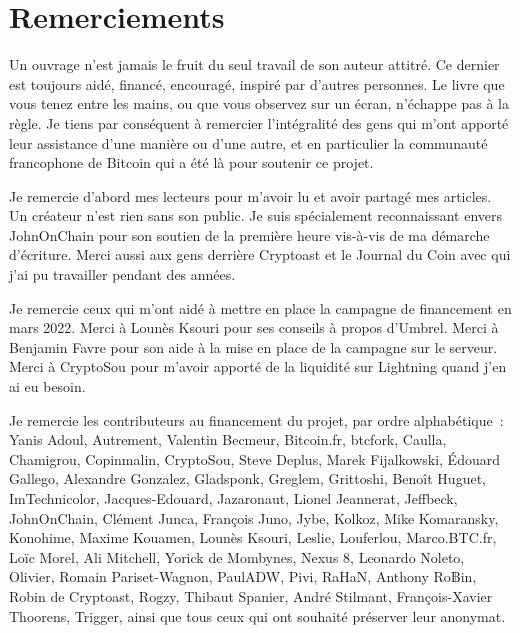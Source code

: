 
\chapter*{Remerciements}

Un ouvrage n'est jamais le fruit du seul travail de son auteur attitré. Ce dernier est toujours aidé, financé, encouragé, inspiré par d'autres personnes. Le livre que vous tenez entre les mains, ou que vous observez sur un écran, n'échappe pas à la règle. Je tiens par conséquent à remercier l'intégralité des gens qui m'ont apporté leur assistance d'une manière ou d'une autre, et en particulier la communauté francophone de Bitcoin qui a été là pour soutenir ce projet.

Je remercie d'abord mes lecteurs pour m'avoir lu et avoir partagé mes articles. Un créateur n'est rien sans son public. Je suis spécialement reconnaissant envers JohnOnChain pour son soutien de la première heure vis-à-vis de ma démarche d'écriture. Merci aussi aux gens derrière Cryptoast et le Journal du Coin avec qui j'ai pu travailler pendant des années.

Je remercie ceux qui m'ont aidé à mettre en place la campagne de financement en mars 2022. Merci à Lounès Ksouri pour ses conseils à propos d'Umbrel. Merci à Benjamin Favre pour son aide à la mise en place de la campagne sur le serveur. Merci à CryptoSou pour m'avoir apporté de la liquidité sur Lightning quand j'en ai eu besoin.

Je remercie les contributeurs au financement du projet, par ordre alphabétique~: Yanis Adoul, Autrement, Valentin Becmeur, Bitcoin.fr, btcfork, Caulla, Chamigrou, Copinmalin, CryptoSou, Steve Deplus, Marek Fijalkowski, Édouard Gallego, Alexandre Gonzalez, Gladsponk, Greglem, Grittoshi, Benoît Huguet, ImTechnicolor, Jacques-Edouard, Jazaronaut, Lionel Jeannerat, Jeffbeck, JohnOnChain, Clément Junca, François Juno, Jybe, Kolkoz, Mike Komaransky, Konohime, Maxime Kouamen, Lounès Ksouri, Leslie, Louferlou, Marco.BTC.fr, Loïc Morel, Ali Mitchell, Yorick de Mombynes, Nexus 8, Leonardo Noleto, Olivier, Romain Pariset-Wagnon, PaulADW, Pivi, RaHaN, Anthony Ro฿in, Robin de Cryptoast, Rogzy, Thibaut Spanier, André Stilmant, François-Xavier Thoorens, Trigger, ainsi que tous ceux qui ont souhaité préserver leur anonymat.

